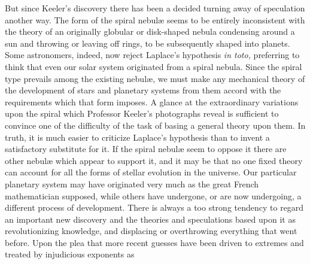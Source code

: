 But since Keeler's discovery there has been a decided turning away of
speculation another way. The form of the spiral nebul{\ae} seems to
be entirely inconsistent with the theory of an originally globular or
disk-shaped nebula condensing around a sun and throwing or leaving off
rings, to be subsequently shaped into planets. Some astronomers,
indeed, now reject Laplace's hypothesis {\em in toto,} preferring to
think that even our solar system originated from a spiral
nebula. Since the spiral type prevails among the existing nebul{\ae},
we must make any mechanical theory of the development of stars and
planetary systems from them accord with the requirements which that
form imposes. A glance at the extraordinary variations upon the spiral
which Professor Keeler's photographs reveal is sufficient to convince
one of the difficulty of the task of basing a general theory upon
them. In truth, it is much easier to criticize Laplace's hypothesis 
than to invent a satisfactory substitute for it. If the spiral
nebul{\ae} seem to oppose it there are other nebul{\ae} which appear to
support it, and it may be that no one fixed theory can account for all
the forms of stellar evolution in the universe. Our particular
planetary system may have originated very much as the great French
mathematician supposed, while others have undergone, or are now
undergoing, a different process of development. There is always a too
strong tendency to regard an important new discovery and the theories
and speculations based upon it as revolutionizing knowledge, and
displacing or overthrowing everything that went before. Upon the plea
that  more recent guesses have been
driven to extremes and treated by injudicious exponents as 

